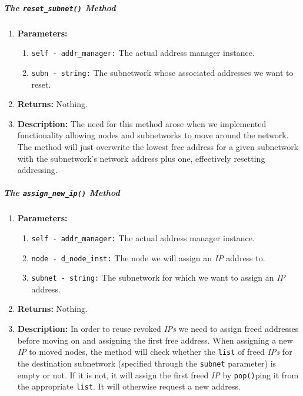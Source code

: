         \subparagraph{The \texttt{reset\_subnet()} Method}
            \begin{enumerate}
                \item \textbf{Parameters:}
                \begin{enumerate}
                    \item \texttt{self - addr\_manager:} The actual address manager instance.
                    \item \texttt{subn - string:} The subnetwork whose associated addresses we want to reset.
                \end{enumerate}
                \item \textbf{Returns:} Nothing.
                \item \textbf{Description:} The need for this method arose when we implemented functionality allowing nodes and subnetworks to move around the network. The method will just overwrite the lowest free address for a given subnetwork with the subnetwork's network address plus one, effectively resetting addressing.
            \end{enumerate}

        \subparagraph{The \texttt{assign\_new\_ip()} Method}
            \begin{enumerate}
                \item \textbf{Parameters:}
                \begin{enumerate}
                    \item \texttt{self - addr\_manager:} The actual address manager instance.
                    \item \texttt{node - d\_node\_inst:} The node we will assign an \textit{IP} address to.
                    \item \texttt{subnet - string:} The subnetwork for which we want to assign an \textit{IP} address.
                \end{enumerate}
                \item \textbf{Returns:} Nothing.
                \item \textbf{Description:} In order to reuse revoked \textit{IPs} we need to assign freed addresses before moving on and assigning the first free address. When assigning a new \textit{IP} to moved nodes, the method will check whether the \texttt{list} of freed \textit{IPs} for the destination subnetwork (specified through the \texttt{subnet} parameter) is empty or not. If it is not, it will assign the first freed \textit{IP} by \texttt{pop()}ping \cite{bib:python-datastructures} it from the appropriate \texttt{list}. It will otherwise request a new address.
            \end{enumerate}
